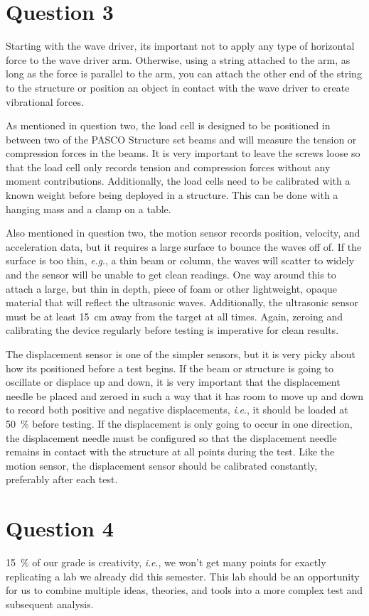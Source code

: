 \documentclass[12 pt]{article}
\newcommand{\ie}{\textit{i}.\textit{e}., }
\newcommand{\eg}{\textit{e}.\textit{g}., }
\begin{document}
\section*{Question 3}
Starting with the wave driver, its important not to apply any type of horizontal force to the wave driver arm. Otherwise, using a string attached to the arm, as long as the force is parallel to the arm, you can attach the other end of the string to the structure or position an object in contact with the wave driver to create vibrational forces.

As mentioned in question two, the load cell is designed to be positioned in between two of the PASCO Structure set beams and will measure the tension or compression forces in the beams. It is very important to leave the screws loose so that the load cell only records tension and compression forces without any moment contributions. Additionally, the load cells need to be calibrated with a known weight before being deployed in a structure. This can be done with a hanging mass and a clamp on a table.

Also mentioned in question two, the motion sensor records position, velocity, and acceleration data, but it requires a large surface to bounce the waves off of. If the surface is too thin, \eg a thin beam or column, the waves will scatter to widely and the sensor will be unable to get clean readings. One way around this to attach a large, but thin in depth, piece of foam or other lightweight, opaque material that will reflect the ultrasonic waves. Additionally, the ultrasonic sensor must be at least \qty{15}{\cm} away from the target at all times. Again, zeroing and calibrating the device regularly before testing is imperative for clean results.

The displacement sensor is one of the simpler sensors, but it is very picky about how its positioned before a test begins. If the beam or structure is going to oscillate or displace up and down, it is very important that the displacement needle be placed and zeroed in such a way that it has room to move up and down to record both positive and negative displacements, \ie it should be loaded at \qty{50}{\percent} before testing. If the displacement is only going to occur in one direction, the displacement needle must be configured so that the displacement needle remains in contact with the structure at all points during the test. Like the motion sensor, the displacement sensor should be calibrated constantly, preferably after each test.

\section*{Question 4}
\qty{15}{\percent} of our grade is creativity, \ie we won't get many points for exactly replicating a lab we already did this semester. This lab should be an opportunity for us to combine multiple ideas, theories, and tools into a more complex test and subsequent analysis.
\end{document}
